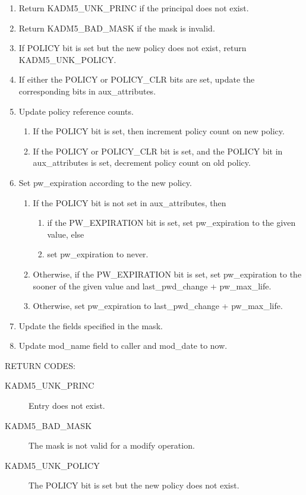 \begin{enumerate}
\item Return KADM5_UNK_PRINC if the principal does not exist.
\item Return KADM5_BAD_MASK if the mask is invalid.
\item If POLICY bit is set but the new policy does not exist, return
KADM5_UNK_POLICY.
\item If either the POLICY or POLICY_CLR bits are set, update the
corresponding bits in aux_attributes.

\item Update policy reference counts.
\begin{enumerate}
\item If the POLICY bit is set, then increment policy count on new
policy.
\item If the POLICY or POLICY_CLR bit is set, and the POLICY bit in
aux_attributes is set, decrement policy count on old policy.
\end{enumerate}

\item Set pw_expiration according to the new policy.
\begin{enumerate}
\item If the POLICY bit is not set in aux_attributes, then
\begin{enumerate}
\item if the PW_EXPIRATION bit is set, set pw_expiration to the given
value, else
\item set pw_expiration to never.
\end{enumerate}
\item Otherwise, if the PW_EXPIRATION bit is set, set pw_expiration to
the sooner of the given value and last_pwd_change + pw_max_life.
\item Otherwise, set pw_expiration to last_pwd_change + pw_max_life.
\end{enumerate}

\item Update the fields specified in the mask.
\item Update mod_name field to caller and mod_date to now.
\end{enumerate}

RETURN CODES:

\begin{description}
\item[KADM5_UNK_PRINC] Entry does not exist.
\item[KADM5_BAD_MASK] The mask is not valid for a modify
operation.
\item[KADM5_UNK_POLICY] The POLICY bit is set but the new
policy does not exist.
\end{description}

